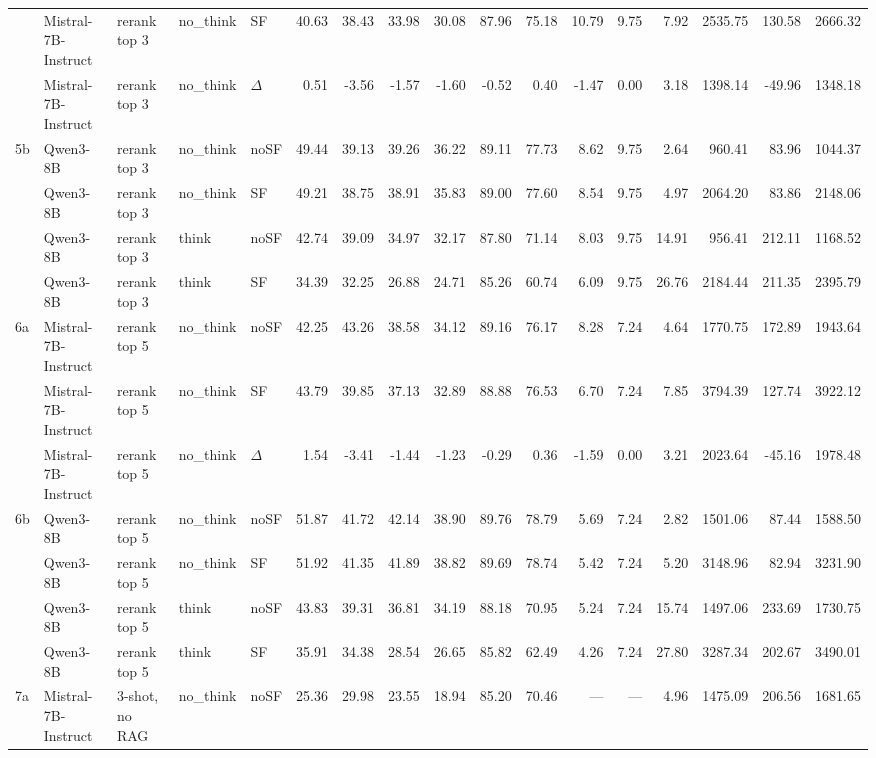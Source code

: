 \begin{landscape}
\begin{footnotesize}
\begin{longtable}{l l l l l r r r r r r r r r r r r}
 & Mistral-7B-Instruct & rerank top 3 & no\_think & SF & 40.63 & 38.43 & 33.98 & 30.08 & 87.96 & 75.18 & 10.79 & 9.75 & 7.92 & 2535.75 & 130.58 & 2666.32 \\
 & Mistral-7B-Instruct & rerank top 3 & no\_think & $\Delta$ & 0.51 & -3.56 & -1.57 & -1.60 & -0.52 & 0.40 & -1.47 & 0.00 & 3.18 & 1398.14 & -49.96 & 1348.18 \\
5b & Qwen3-8B & rerank top 3 & no\_think & noSF & 49.44 & 39.13 & 39.26 & 36.22 & 89.11 & 77.73 & 8.62 & 9.75 & 2.64 & 960.41 & 83.96 & 1044.37 \\
 & Qwen3-8B & rerank top 3 & no\_think & SF & 49.21 & 38.75 & 38.91 & 35.83 & 89.00 & 77.60 & 8.54 & 9.75 & 4.97 & 2064.20 & 83.86 & 2148.06 \\
 & Qwen3-8B & rerank top 3 & think & noSF & 42.74 & 39.09 & 34.97 & 32.17 & 87.80 & 71.14 & 8.03 & 9.75 & 14.91 & 956.41 & 212.11 & 1168.52 \\
 & Qwen3-8B & rerank top 3 & think & SF & 34.39 & 32.25 & 26.88 & 24.71 & 85.26 & 60.74 & 6.09 & 9.75 & 26.76 & 2184.44 & 211.35 & 2395.79 \\
\midrule
6a & Mistral-7B-Instruct & rerank top 5 & no\_think & noSF & 42.25 & 43.26 & 38.58 & 34.12 & 89.16 & 76.17 & 8.28 & 7.24 & 4.64 & 1770.75 & 172.89 & 1943.64 \\
 & Mistral-7B-Instruct & rerank top 5 & no\_think & SF & 43.79 & 39.85 & 37.13 & 32.89 & 88.88 & 76.53 & 6.70 & 7.24 & 7.85 & 3794.39 & 127.74 & 3922.12 \\
 & Mistral-7B-Instruct & rerank top 5 & no\_think & $\Delta$ & 1.54 & -3.41 & -1.44 & -1.23 & -0.29 & 0.36 & -1.59 & 0.00 & 3.21 & 2023.64 & -45.16 & 1978.48 \\
6b & Qwen3-8B & rerank top 5 & no\_think & noSF & 51.87 & 41.72 & 42.14 & 38.90 & 89.76 & 78.79 & 5.69 & 7.24 & 2.82 & 1501.06 & 87.44 & 1588.50 \\
 & Qwen3-8B & rerank top 5 & no\_think & SF & 51.92 & 41.35 & 41.89 & 38.82 & 89.69 & 78.74 & 5.42 & 7.24 & 5.20 & 3148.96 & 82.94 & 3231.90 \\
 & Qwen3-8B & rerank top 5 & think & noSF & 43.83 & 39.31 & 36.81 & 34.19 & 88.18 & 70.95 & 5.24 & 7.24 & 15.74 & 1497.06 & 233.69 & 1730.75 \\
 & Qwen3-8B & rerank top 5 & think & SF & 35.91 & 34.38 & 28.54 & 26.65 & 85.82 & 62.49 & 4.26 & 7.24 & 27.80 & 3287.34 & 202.67 & 3490.01 \\
\midrule
7a & Mistral-7B-Instruct & 3-shot, no RAG & no\_think & noSF & 25.36 & 29.98 & 23.55 & 18.94 & 85.20 & 70.46 & --- & --- & 4.96 & 1475.09 & 206.56 & 1681.65 \\

\end{longtable}
\end{footnotesize}
\end{landscape}

